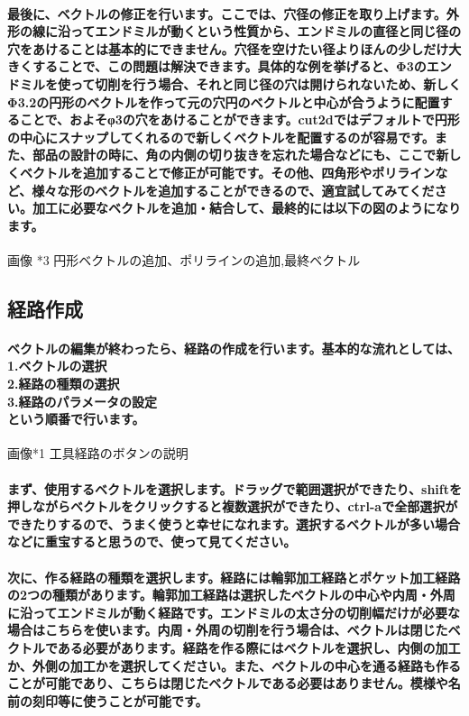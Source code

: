 \documentclass[b5paper, 9pt, twocolumn, titlepage,openany]{jsbook}%
\begin{document}
\paragraph{最後に、ベクトルの修正を行います。ここでは、穴径の修正を取り上げます。外形の線に沿ってエンドミルが動くという性質から、エンドミルの直径と同じ径の穴をあけることは基本的にできません。穴径を空けたい径よりほんの少しだけ大きくすることで、この問題は解決できます。具体的な例を挙げると、Φ3のエンドミルを使って切削を行う場合、それと同じ径の穴は開けられないため、新しくΦ3.2の円形のベクトルを作って元の穴円のベクトルと中心が合うように配置することで、およそφ3の穴をあけることができます。cut2dではデフォルトで円形の中心にスナップしてくれるので新しくベクトルを配置するのが容易です。また、部品の設計の時に、角の内側の切り抜きを忘れた場合などにも、ここで新しくベクトルを追加することで修正が可能です。その他、四角形やポリラインなど、様々な形のベクトルを追加することができるので、適宜試してみてください。加工に必要なベクトルを追加・結合して、最終的には以下の図のようになります。}

画像 *3 円形ベクトルの追加、ポリラインの追加,最終ベクトル

\subsection{経路作成}
\paragraph{ベクトルの編集が終わったら、経路の作成を行います。基本的な流れとしては、\\
1.ベクトルの選択\\
2.経路の種類の選択\\
3.経路のパラメータの設定\\
という順番で行います。}

画像*1 工具経路のボタンの説明

\paragraph{まず、使用するベクトルを選択します。ドラッグで範囲選択ができたり、shiftを押しながらベクトルをクリックすると複数選択ができたり、ctrl-aで全部選択ができたりするので、うまく使うと幸せになれます。選択するベクトルが多い場合などに重宝すると思うので、使って見てください。}
\paragraph{次に、作る経路の種類を選択します。経路には輪郭加工経路とポケット加工経路の2つの種類があります。輪郭加工経路は選択したベクトルの中心や内周・外周に沿ってエンドミルが動く経路です。エンドミルの太さ分の切削幅だけが必要な場合はこちらを使います。内周・外周の切削を行う場合は、ベクトルは閉じたベクトルである必要があります。経路を作る際にはベクトルを選択し、内側の加工か、外側の加工かを選択してください。また、ベクトルの中心を通る経路も作ることが可能であり、こちらは閉じたベクトルである必要はありません。模様や名前の刻印等に使うことが可能です。}
\end{document}
